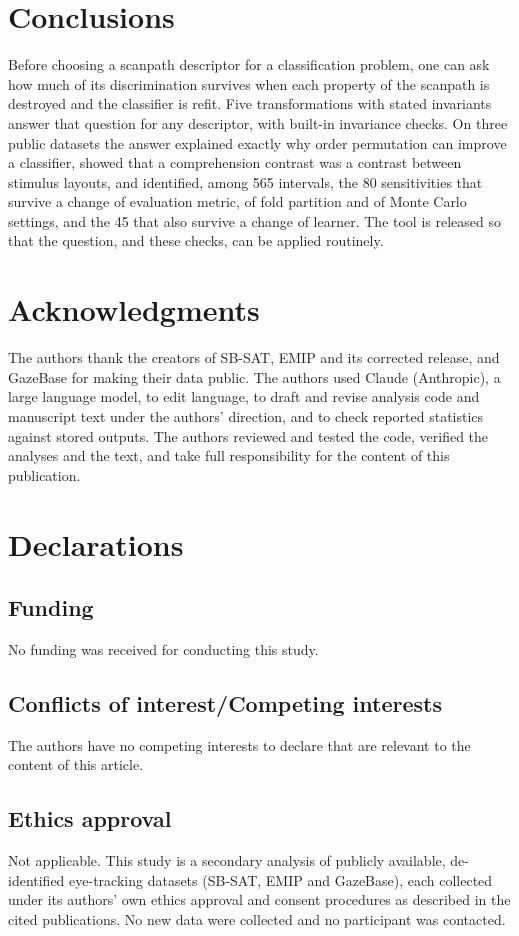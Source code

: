 \documentclass[man,floatsintext,12pt]{apa7}
\begin{document}
\section{Conclusions}
Before choosing a scanpath descriptor for a classification problem, one can ask how much of its discrimination survives when each property of the scanpath is destroyed and the classifier is refit. Five transformations with stated invariants answer that question for any descriptor, with built-in invariance checks. On three public datasets the answer explained exactly why order permutation can improve a classifier, showed that a comprehension contrast was a contrast between stimulus layouts, and identified, among 565 intervals, the 80 sensitivities that survive a change of evaluation metric, of fold partition and of Monte Carlo settings, and the 45 that also survive a change of learner. The tool is released so that the question, and these checks, can be applied routinely.

\section*{Acknowledgments}
The authors thank the creators of SB-SAT, EMIP and its corrected release, and GazeBase for making their data public. The authors used Claude (Anthropic), a large language model, to edit language, to draft and revise analysis code and manuscript text under the authors' direction, and to check reported statistics against stored outputs. The authors reviewed and tested the code, verified the analyses and the text, and take full responsibility for the content of this publication.

\section*{Declarations}
\subsection*{Funding}
No funding was received for conducting this study.

\subsection*{Conflicts of interest/Competing interests}
The authors have no competing interests to declare that are relevant to the content of this article.

\subsection*{Ethics approval}
Not applicable. This study is a secondary analysis of publicly available, de-identified eye-tracking datasets (SB-SAT, EMIP and GazeBase), each collected under its authors' own ethics approval and consent procedures as described in the cited publications. No new data were collected and no participant was contacted.
\end{document}
